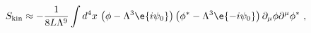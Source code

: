 \begin{equation}
\label{Skin_1}
  S_{\mathrm{kin}} \approx -\frac1{8L\Lambda^9} \int d^4
  x\, \left( \phi -\Lambda^3 \e{i\psi_0}\right)
  \left( \phi^\ast -\Lambda^3 \e{-i\psi_0} \right) 
  \partial_\mu \phi \partial^\mu\phi^\ast ~,   
\end{equation}

